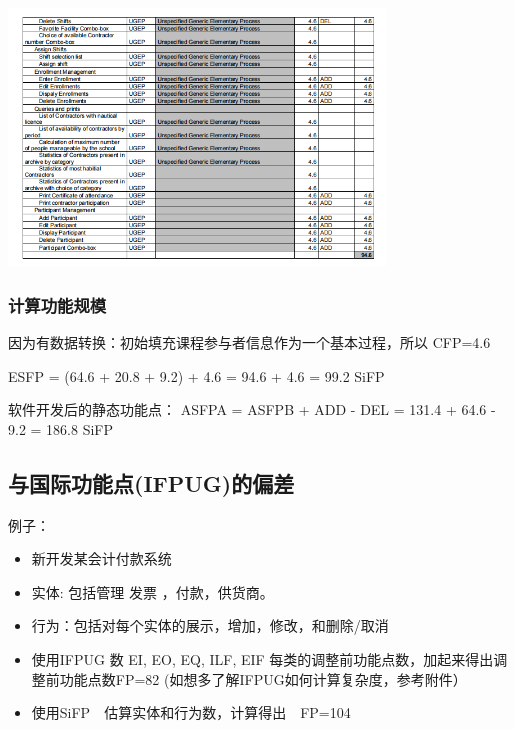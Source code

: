 
\includegraphics[width=10cm]{微信截图20210412093858.png}

\hypertarget{ux8ba1ux7b97ux529fux80fdux89c4ux6a21-1}{%
\subsubsection{计算功能规模}\label{ux8ba1ux7b97ux529fux80fdux89c4ux6a21-1}}

\begin{description}
\item[]
\end{description}

因为有数据转换：初始填充课程参与者信息作为一个基本过程，所以 CFP=4.6

\begin{description}
\tightlist
\item[]
ESFP = (64.6 + 20.8 + 9.2) + 4.6 = 94.6 + 4.6 = 99.2 SiFP
\end{description}

软件开发后的静态功能点： ASFPA = ASFPB + ADD - DEL = 131.4 + 64.6 - 9.2
= 186.8 SiFP

\hypertarget{ux4e0eux56fdux9645ux529fux80fdux70b9ifpugux7684ux504fux5dee}{%
\subsection{与国际功能点(IFPUG)的偏差}\label{ux4e0eux56fdux9645ux529fux80fdux70b9ifpugux7684ux504fux5dee}}

例子：

\begin{itemize}
\tightlist
\item
  新开发某会计付款系统
\item
  实体: 包括管理 发票 ，付款，供货商。
\item
  行为：包括对每个实体的展示，增加，修改，和删除/取消
\item
  使用IFPUG 数 EI, EO, EQ, ILF, EIF
  每类的调整前功能点数，加起来得出调整前功能点数FP=82
  (如想多了解IFPUG如何计算复杂度，参考附件）
\item
  使用SiFP　估算实体和行为数，计算得出　FP=104
\end{itemize}

